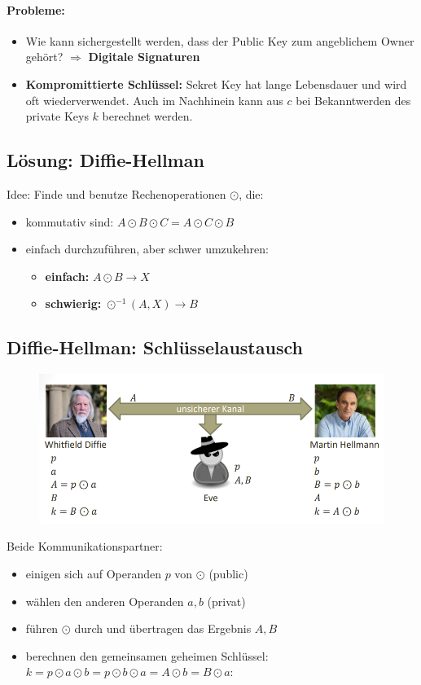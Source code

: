 \paragraph{Probleme:}
\begin{itemize}
	\item Wie kann sichergestellt werden, dass der Public Key zum angeblichem Owner gehört? $\Rightarrow$ \textbf{Digitale Signaturen}
	\item \textbf{Kompromittierte Schlüssel:} Sekret Key hat lange Lebensdauer und wird oft wiederverwendet. Auch im Nachhinein kann aus $c$ bei Bekanntwerden des private Keys $k$ berechnet werden.
\end{itemize}

\subsection{Lösung: Diffie-Hellman}
Idee: Finde und benutze Rechenoperationen $\odot$, die:
\begin{itemize}
	\item kommutativ sind: $A \odot B \odot C = A \odot C \odot B$
	\item einfach durchzuführen, aber schwer umzukehren:
	\begin{itemize}
	\item \textbf{einfach:} $A \odot B \rightarrow X$
	\item \textbf{schwierig:} $\odot^{-1}(A, X) \rightarrow B$
\end{itemize}
\end{itemize}

\subsection{Diffie-Hellman: Schlüsselaustausch}
\begin{figure}[H]
	\begin{center}
		\includegraphics[scale=0.7]{Resources/DH3}
		\caption{}
		\label{fig:DH3}
	\end{center}
\end{figure}
Beide Kommunikationspartner:
\begin{itemize}
	\item einigen sich auf Operanden $p$ von $\odot$ (public)
	\item wählen den anderen Operanden $a, b$ (privat)
	\item führen $\odot$ durch und übertragen das Ergebnis $A, B$
	\item berechnen den gemeinsamen geheimen Schlüssel: \\$k = p \odot a \odot b = p \odot b \odot a = A \odot b = B \odot a$: 
\end{itemize}

